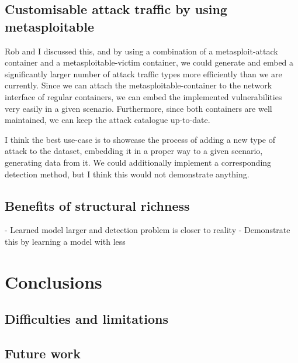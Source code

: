 \documentclass[sigconf]{acmart}
\begin{document}

\subsection{Customisable attack traffic by using metasploitable}

Rob and I discussed this, and by using a combination of a metasploit-attack container and a metasploitable-victim container, we could generate and embed a significantly larger number of attack traffic types more efficiently than we are currently. Since we can attach the metasploitable-container to the network interface of regular containers, we can embed the implemented vulnerabilities very easily in a given scenario. Furthermore, since both containers are well maintained, we can keep the attack catalogue up-to-date.

I think the best use-case is to showcase the process of adding a new type of attack to the dataset, embedding it in a proper way to a given scenario, generating data from it. We could additionally implement a corresponding detection method, but I think this would not demonstrate anything. 


 


\subsection{Benefits of structural richness}


- Learned model larger and detection problem is closer to reality
- Demonstrate this by learning a model with less


\section{Conclusions}\label{Sec:Conclusion}



\subsection{Difficulties and limitations}


\subsection{Future work}
\end{document}
